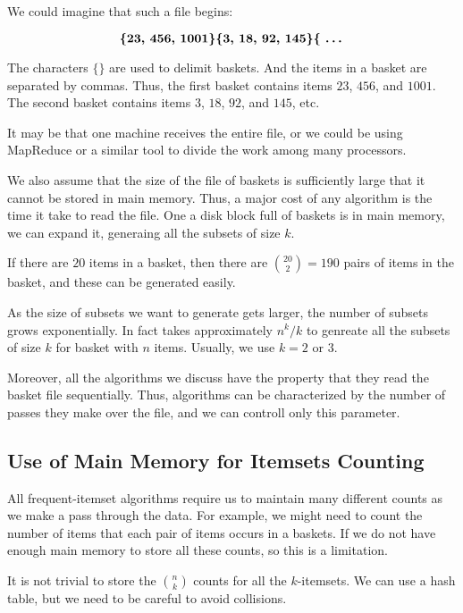 We could imagine that such a file begins:

\begin{equation*}
    \textbf{\{23, 456, 1001\}\{3, 18, 92, 145\}\{ \dots} 
\end{equation*}

The characters $\{ \}$ are used to delimit baskets. And the items in a basket are separated by commas. Thus, the first basket contains items $23$, $456$, and $1001$. The second basket contains items $3$, $18$, $92$, and $145$, etc.

It may be that one machine receives the entire file, or we could be using MapReduce or a similar tool to divide the work among many processors. 

We also assume that the size of the file of baskets is sufficiently large that it cannot be stored in main memory. Thus, a major cost of any algorithm is the time it take to read the file. One a disk block full of baskets is in main memory, we can expand it, generaing all the subsets of size $k$.

If there are $20$ items in a basket, then there are $\binom{20}{2} = 190$ pairs of items in the basket, and these can be generated easily.

As the size of subsets we want to generate gets larger, the number of subsets grows exponentially. In fact takes approximately $n^k / k$ to genreate all the subsets of size $k$ for basket with $n$ items. Usually, we use $k = 2$ or $3$.

Moreover, all the algorithms we discuss have the property that they read the basket file sequentially. Thus, algorithms can be characterized by the number of passes they make over the file, and we can controll only this parameter.

\subsection{Use of Main Memory for Itemsets Counting}\label{subsec:use-of-main-memory-for-itemsets-counting}

All frequent-itemset algorithms require us to maintain many different counts as we make a pass through the data. For example, we might need to count the number of items that each pair of items occurs in a baskets. If we do not have enough main memory to store all these counts, so this is a limitation. 

It is not trivial to store the $\binom{n}{k}$ counts for all the $k$-itemsets. We can use a hash table, but we need to be careful to avoid collisions.



